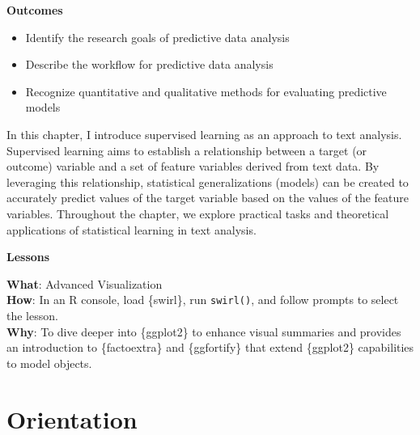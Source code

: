 \documentclass[
  letterpaper,
  krantz1]{latex/krantz-mod}
\providecommand{\tightlist}{%
  \setlength{\itemsep}{0pt}\setlength{\parskip}{0pt}}\usepackage{longtable,booktabs,array}
\newcommand{\setDOI}[1]{\gdef\doi{#1}}
\theoremstyle{definition}
\theoremstyle{definition}
\theoremstyle{remark}
\begin{document}
\setDOI{10.4324/9781003393764.9}
\thispagestyle{chapterfirstpage}

\begin{tcolorbox}[enhanced jigsaw, leftrule=.75mm, colframe=quarto-callout-color-frame, left=2mm, colback=white, toprule=.15mm, breakable, arc=.35mm, opacityback=0, bottomrule=.15mm, rightrule=.15mm]

\textbf{ Outcomes}

\begin{itemize}
\tightlist
\item
  Identify the research goals of predictive data analysis
\item
  Describe the workflow for predictive data analysis
\item
  Recognize quantitative and qualitative methods for evaluating
  predictive models
\end{itemize}

\end{tcolorbox}

In this chapter, I introduce supervised learning as an approach to text
analysis. Supervised learning aims to establish a relationship between a
target (or outcome) variable and a set of feature variables derived from
text data. By leveraging this relationship, statistical generalizations
(models) can be created to accurately predict values of the target
variable based on the values of the feature variables. Throughout the
chapter, we explore practical tasks and theoretical applications of
statistical learning in text analysis.

\begin{tcolorbox}[enhanced jigsaw, leftrule=.75mm, colframe=quarto-callout-color-frame, left=2mm, colback=white, toprule=.15mm, breakable, arc=.35mm, opacityback=0, bottomrule=.15mm, rightrule=.15mm]

\textbf{ Lessons}

\textbf{What}: Advanced Visualization\\
\textbf{How}: In an R console, load \{swirl\}, run \texttt{swirl()}, and
follow prompts to select the lesson.\\
\textbf{Why}: To dive deeper into \{ggplot2\} to enhance visual
summaries and provides an introduction to \{factoextra\} and
\{ggfortify\} that extend \{ggplot2\} capabilities to model objects.

\end{tcolorbox}

\section{Orientation}\label{sec-predict-orientation}
\end{document}
